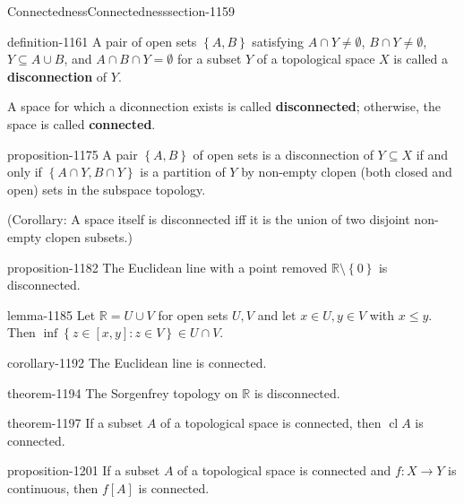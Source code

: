 \documentclass[oneside,10pt,]{article}
\newcommand{\terminology}[1]{\textbf{#1}}
\newcommand{\mb}{\mathbb}
\newcommand{\cl}{\operatorname{cl}}
\newcommand{\setBuilder}[2]{\left\{#1:#2\right\}}
\newcommand{\setList}[1]{\left\{#1\right\}}
\begin{document}
\begin{sectionptx}{Connectedness}{}{Connectedness}{}{}{section-1159}
\begin{definition}{}{definition-1161}%
\hypertarget{p-1162}{}%
A pair of open sets \(\setList{A,B}\) satisfying \(A\cap Y\not=\emptyset\), \(B\cap Y\not=\emptyset\), \(Y\subseteq A\cup B\), and \(A\cap B\cap Y=\emptyset\) for a subset \(Y\) of a topological space \(X\) is called a \terminology{disconnection} of \(Y\).%
\par
\hypertarget{p-1172}{}%
A space for which a diconnection exists is called \terminology{disconnected}; otherwise, the space is called \terminology{connected}.%
\end{definition}
\begin{proposition}{}{}{proposition-1175}%
\hypertarget{p-1176}{}%
A pair \(\setList{A,B}\) of open sets is a disconnection of \(Y\subseteq X\) if and only if \(\setList{A\cap Y,B\cap Y}\) is a partition of \(Y\) by non-empty clopen (both closed and open) sets in the subspace topology.%
\end{proposition}
\hypertarget{p-1181}{}%
(Corollary: A space itself is disconnected iff it is the union of two disjoint non-empty clopen subsets.)%
\begin{proposition}{}{}{proposition-1182}%
\hypertarget{p-1183}{}%
The Euclidean line with a point removed \(\mb R\setminus\setList{0}\) is disconnected.%
\end{proposition}
\begin{lemma}{}{}{lemma-1185}%
\hypertarget{p-1186}{}%
Let \(\mb R=U\cup V\) for open sets \(U,V\) and let \(x\in U,y\in V\) with \(x\leq y\).  Then \(\inf\setBuilder{z\in[x,y]}{z\in V}\in U\cap V\).%
\end{lemma}
\begin{corollary}{}{}{corollary-1192}%
\hypertarget{p-1193}{}%
The Euclidean line is connected.%
\end{corollary}
\begin{theorem}{}{}{theorem-1194}%
\hypertarget{p-1195}{}%
The Sorgenfrey topology on \(\mb R\) is disconnected.%
\end{theorem}
\begin{theorem}{}{}{theorem-1197}%
\hypertarget{p-1198}{}%
If a subset \(A\) of a topological space is connected, then \(\cl A\) is connected.%
\end{theorem}
\begin{proposition}{}{}{proposition-1201}%
\hypertarget{p-1202}{}%
If a subset \(A\) of a topological space is connected and \(f:X\to Y\) is continuous, then \(f[A]\) is connected.%

\end{proposition}
\end{sectionptx}
\end{document}
